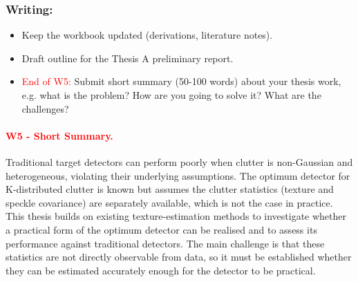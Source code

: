 \documentclass{article}
\begin{document}
\subsubsection{Writing:}
\begin{itemize}
    \item Keep the workbook updated (derivations, literature notes).
    \item Draft outline for the Thesis A preliminary report.
    \item \textcolor{red}{End of W5:} Submit short summary (50-100 words) about your thesis work, e.g. what is the problem? How are you going to solve it? What are the challenges? 
\end{itemize}

\paragraph{\textcolor{red}{W5 - Short Summary.}}
Traditional target detectors can perform poorly when clutter is non-Gaussian and heterogeneous, violating their underlying assumptions. The optimum detector for K-distributed clutter is known but assumes the clutter statistics (texture and speckle covariance) are separately available, which is not the case in practice. This thesis builds on existing texture-estimation methods to investigate whether a practical form of the optimum detector can be realised and to assess its performance against traditional detectors. The main challenge is that these statistics are not directly observable from data, so it must be established whether they can be estimated accurately enough for the detector to be practical.


\newpage


\end{document}
